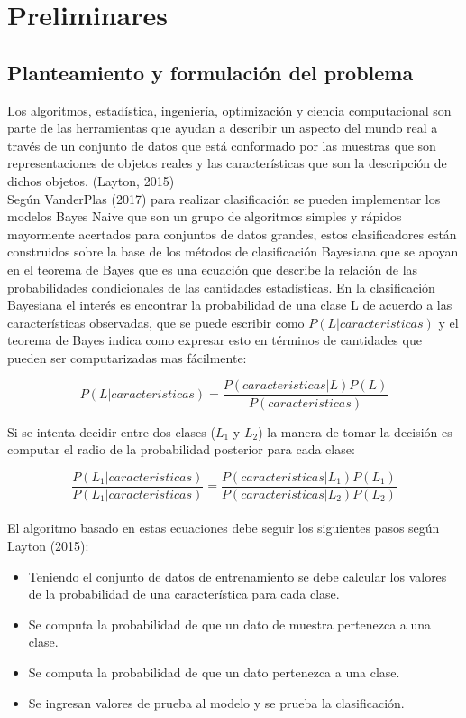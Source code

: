\chapter{Preliminares}

\section{Planteamiento y formulaci\'on del problema}

Los algoritmos, estadística, ingeniería, optimización y ciencia computacional son parte de las herramientas que ayudan a describir un aspecto del mundo real a través de un conjunto de datos que está conformado por las muestras que son representaciones de objetos reales y las características que son la descripción de dichos objetos. (Layton, 2015)\\

Según VanderPlas (2017) para realizar clasificación se pueden implementar los modelos Bayes Naive que son un grupo de algoritmos simples y rápidos mayormente acertados para conjuntos de datos grandes, estos clasificadores están construidos sobre la base de los métodos de clasificación Bayesiana que se apoyan en el teorema de Bayes que es una ecuación que describe la relación de las probabilidades condicionales de las cantidades estadísticas. En la clasificación Bayesiana el interés es encontrar la probabilidad de una clase L de acuerdo a las características observadas, que se puede escribir como $P\left(L|caracteristicas\right)$ y el teorema de Bayes indica como expresar esto en términos de cantidades que pueden ser computarizadas mas fácilmente:

\[P\left(L|caracteristicas\right)=\frac{P\left(caracteristicas|L\right)P\left(L\right)}{P\left(caracteristicas\right)}\]
  
Si se intenta decidir entre dos clases ($L_{1}$ y $L_{2}$) la manera de tomar la decisión es computar el radio de la probabilidad posterior para cada clase:

\[\frac{P\left(L_{1}|caracteristicas\right)}{P\left(L_{1}|caracteristicas\right)}=\frac{P\left(caracteristicas|L_{1}\right)P\left(L_{1}\right)}{P\left(caracteristicas|L_{2}\right)P\left(L_{2}\right)}\]\\

El algoritmo basado en estas ecuaciones debe seguir los siguientes pasos según Layton (2015):

\begin{itemize}
	\item Teniendo el conjunto de datos de entrenamiento se debe calcular los valores de la probabilidad de una característica para cada clase.
	\item Se computa la probabilidad de que un dato de muestra pertenezca a una clase.
	\item Se computa la probabilidad de que un dato pertenezca a una clase.
	\item Se ingresan valores de prueba al modelo y se prueba la clasificación.
\end{itemize}

